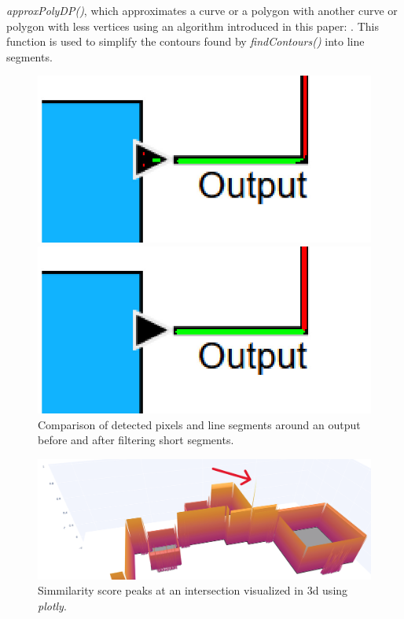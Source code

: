 \textit{approxPolyDP()}, which approximates a curve or a polygon with another curve or polygon with less vertices using an algorithm introduced in this paper: \cite{art_approx_Poly_DP_algorithm}. This function is used to simplify the contours found by \textit{findContours()} into line segments.
\begin{figure}[h]
  \centering
  \begin{minipage}[b]{0.45\textwidth}
    \includegraphics[width=\textwidth]{Pictures/thresh_zoom.png}
  \end{minipage}
  \hfill
  \begin{minipage}[b]{0.45\textwidth}
    \includegraphics[width=\textwidth]{Pictures/line_segments_zoom.png}
  \end{minipage}
  \caption{Comparison of detected pixels and line segments around an output before and after filtering short segments.}
  \label{fig_comparison_filter}
\end{figure}
\begin{figure}
    \centering
    \includegraphics[width=1\linewidth]{Pictures/intersection_peak.png}
    \caption{Simmilarity score peaks at an intersection visualized in 3d using \textit{plotly}.}
    \label{fig_intersection_peak}
\end{figure}\\
